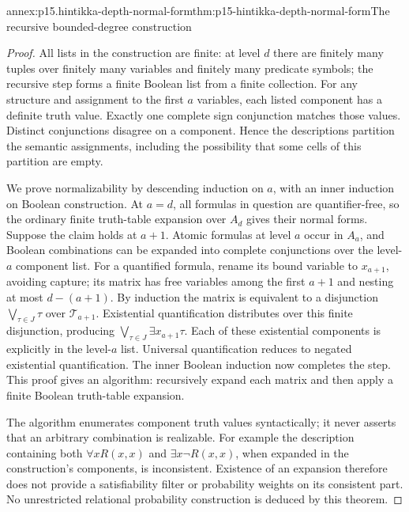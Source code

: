 \begin{annexitem}{annex:p15.hintikka-depth-normal-form}{thm:p15-hintikka-depth-normal-form}{The recursive bounded-degree construction}
\begin{proof}
All lists in the construction are finite: at level \(d\) there are
finitely many tuples over finitely many variables and finitely many
predicate symbols; the recursive step forms a finite Boolean list from
a finite collection. For any structure and assignment to the first
\(a\) variables, each listed component has a definite truth value.
Exactly one complete sign conjunction matches those values. Distinct
conjunctions disagree on a component. Hence the descriptions partition
the semantic assignments, including the possibility that some cells of
this partition are empty.

We prove normalizability by descending induction on \(a\), with an
inner induction on Boolean construction. At \(a=d\), all formulas
in question are quantifier-free, so the ordinary finite truth-table
expansion over \(A_d\) gives their normal forms. Suppose the claim
holds at \(a+1\). Atomic formulas at level \(a\) occur in
\(A_a\), and Boolean combinations can be expanded into complete
conjunctions over the level-\(a\) component list. For a quantified
formula, rename its bound variable to \(x_{a+1}\), avoiding capture;
its matrix has free variables among the first \(a+1\) and nesting
at most \(d-(a+1)\). By induction the matrix is equivalent to a
disjunction \(\bigvee_{\tau\in J}\tau\) over
\(\mathcal T_{a+1}\). Existential quantification distributes over
this finite disjunction, producing
\(\bigvee_{\tau\in J}\exists x_{a+1}\tau\).
Each of these existential components is explicitly in the level-\(a\)
list. Universal quantification reduces to negated existential
quantification. The inner Boolean induction now completes the step.
This proof gives an algorithm: recursively expand each matrix and
then apply a finite Boolean truth-table expansion.

The algorithm enumerates component truth values syntactically; it never
asserts that an arbitrary combination is realizable. For example the
description containing both \(\forall xR(x,x)\) and
\(\exists x\neg R(x,x)\), when expanded in the construction's
components, is inconsistent. Existence of an expansion therefore does
not provide a satisfiability filter or probability weights on its
consistent part. No unrestricted relational probability construction
is deduced by this theorem.
\end{proof}
\end{annexitem}

